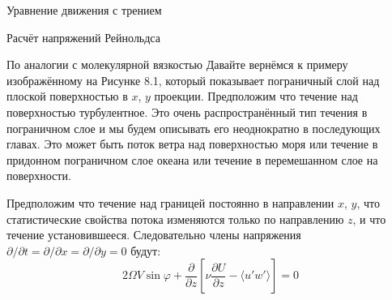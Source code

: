 \begin{chapter}{Уравнение движения с трением}
\begin{section}{Расчёт напряжений Рейнольдса}
\begin{paragraph}{По аналогии с молекулярной вязкостью}
Давайте вернёмся к примеру изображённому на Рисунке 8.1, который
показывает пограничный слой над плоской поверхностью в $x$, $y$
проекции. Предположим что течение над поверхностью турбулентное. Это
очень распространённый тип течения в пограничном слое и мы будем
описывать его неоднократно в последующих главах. Это может быть поток
ветра над поверхностью моря или течение в придонном пограничном слое
океана или течение в перемешанном слое на поверхности.
%

Предположим что течение над границей постоянно в направлении $x$, $y$, что
статистические свойства потока изменяются только по направлению $z$, и
что течение установившееся. Следовательно члены 
напряжения~$\partial /\partial t = \partial /\partial x = \partial /\partial y = 0$
будут:
\begin{equation}
2 \Omega V \sin \varphi + \frac{\partial }{\partial z} 
 \left[\nu \frac{\partial U}{\partial z} - \langle u'w'\rangle \right] = 0
\end{equation}
%


\end{paragraph}
\end{section}
\end{chapter}
